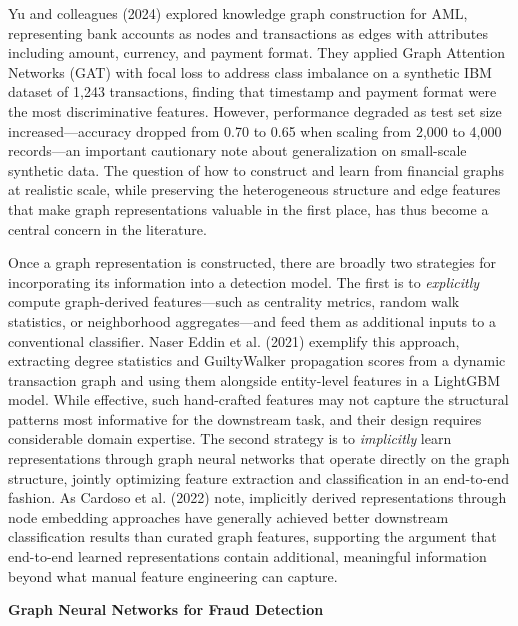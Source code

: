 \documentclass[12pt,a4paper]{article}
\begin{document}
Yu and colleagues (2024) explored knowledge graph construction for AML, representing bank accounts as nodes and transactions as edges with attributes including amount, currency, and payment format. They applied Graph Attention Networks (GAT) with focal loss to address class imbalance on a synthetic IBM dataset of 1,243 transactions, finding that timestamp and payment format were the most discriminative features. However, performance degraded as test set size increased---accuracy dropped from 0.70 to 0.65 when scaling from 2,000 to 4,000 records---an important cautionary note about generalization on small-scale synthetic data. The question of how to construct and learn from financial graphs at realistic scale, while preserving the heterogeneous structure and edge features that make graph representations valuable in the first place, has thus become a central concern in the literature.

Once a graph representation is constructed, there are broadly two strategies for incorporating its information into a detection model. The first is to \emph{explicitly} compute graph-derived features---such as centrality metrics, random walk statistics, or neighborhood aggregates---and feed them as additional inputs to a conventional classifier. Naser Eddin et al. (2021) exemplify this approach, extracting degree statistics and GuiltyWalker propagation scores from a dynamic transaction graph and using them alongside entity-level features in a LightGBM model. While effective, such hand-crafted features may not capture the structural patterns most informative for the downstream task, and their design requires considerable domain expertise. The second strategy is to \emph{implicitly} learn representations through graph neural networks that operate directly on the graph structure, jointly optimizing feature extraction and classification in an end-to-end fashion. As Cardoso et al. (2022) note, implicitly derived representations through node embedding approaches have generally achieved better downstream classification results than curated graph features, supporting the argument that end-to-end learned representations contain additional, meaningful information beyond what manual feature engineering can capture.

\bigskip
\noindent\textbf{Graph Neural Networks for Fraud Detection}
\end{document}
